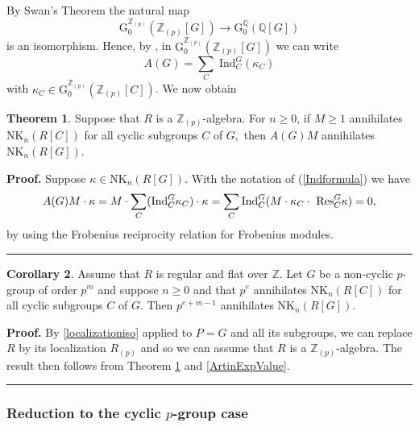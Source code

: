 \documentclass[reqno,11pt,letterpaper]{amsart}
\theoremstyle{plain}
\numberwithin{equation}{subsection}
\newtheorem{theorem}[equation]{Theorem}
\newtheorem{corollary}[equation]{Corollary}
\theoremstyle{remark}
\theoremstyle{plain}
\theoremstyle{definition}\newtheorem*{notation}{Notation}
\newcommand{\Q}{{\mathbb Q}}
\newtheorem{theorem}{Theorem}
\newtheorem{corollary}[theorem]{Corollary}
\newenvironment{proof}[1][Proof]{\noindent\textbf{#1.} }{\ \rule{0.5em}{0.5em}}
\newcommand{\RG}{\mathrm{G}}
\newcommand{\RNK}{\mathrm{NK}}
\newcommand{\BZ}{\mathbb{Z}}
\begin{document}
 



By Swan's Theorem \cite[Thm. 39.10]{CR94} the natural map
\[
\RG^{\BZ_{(p)}}_{0}( \mathbb{Z}_{(p)}[ G] ) \to \RG^\Q_{0}( \Q[ G] )
\]
is an isomorphism. Hence, by \cite[p. 785, Cor. 76.8]{CR94}, in $\RG^{\mathbb{Z}_{(p)}}_{0}( \mathbb{Z}_{(p)}[ G] )$  we can write 
\begin{equation}\label{Indformula}
A(G) =\sum_{C}\; \mathrm{Ind}_{C}^{G}(\kappa _{C})
\end{equation}
with   $\kappa _{C}\in \RG^{\mathbb{Z}_{(p)}}_{0}(\mathbb{Z}_{(p)}
[ C] )$.   We now obtain
 \begin{theorem}\label{reduction to cyclic}
 Suppose that $R$ is a $\BZ_{(p)}$-algebra.
For $n\geq 0$, if $M\geq 1$ annihilates $\RNK_{n}( R[ C] ) $ for all cyclic
subgroups $C$ of $G,$  then $A( G) M$ annihilates $\RNK_{n}( R[ G
] )$. 
\end{theorem}

\begin{proof} Suppose $\kappa \in \RNK_{n}( R[ G] ) $.  With the notation of (\ref{Indformula})  we have 
\begin{eqnarray*}
A( G) M\cdot \kappa = M\cdot\sum_{C}   ( \mathrm{Ind} 
_{C}^{G}\kappa _{C}) \cdot \kappa  
=\sum_{C}  \mathrm{Ind}_{C}^{G}( M\cdot \kappa _{C}\cdot \text{ 
\textrm{Res}}_{C}^{G}\kappa) =0, 
\end{eqnarray*}
 by using the Frobenius reciprocity relation for Frobenius modules. \end{proof}
 
 \begin{corollary}\label{killNKR} Assume that $R$ is regular and flat over $\BZ$.
Let $G$ be a non-cyclic $p$-group of order $p^{m}$ and
suppose $n\geq 0$ and that $p^{e}$ annihilates $\RNK_{n}( R[ C] ) $
 for all cyclic subgroups $C$ of $G$. Then  $p^{e+m-1}$
annihilates $\RNK_{n}( R[ G] )$. 
 \end{corollary}

\begin{proof}
By \eqref{localizationiso} applied to $P=G$ and all its subgroups, we can replace $R$ by its localization $R_{(p)}$ and so we can assume that $R$ is a $\BZ_{(p)}$-algebra.
The result then follows from Theorem \ref{reduction to cyclic} and \eqref{ArtinExpValue}.
\end{proof}
 

 
\subsubsection{Reduction to the cyclic $p$-group case}  
 
\end{document}
